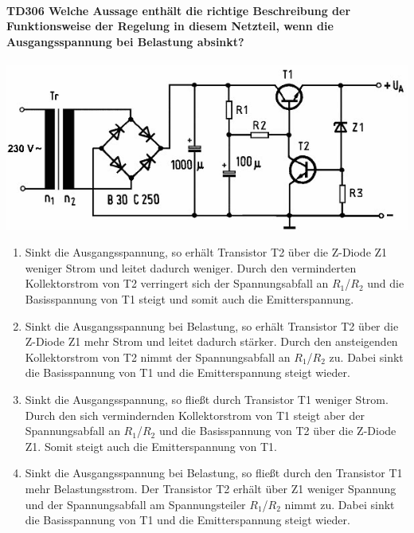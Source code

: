 \documentclass[8pt]{article}
\begin{document}
\begin{enumerate}
\begin{enumerate}[nolistsep,label=\Alph*]
{\paragraph*{TD306 Welche Aussage enthält die richtige Beschreibung der Funktionsweise der Regelung in diesem Netzteil, wenn die Ausgangsspannung bei Belastung absinkt?}
\begin{center}
	\begin{minipage}{\linewidth}
		\centering
		\includegraphics[scale=1.0]{pics/td306_a.jpg}
	\end{minipage}
\end{center}
\begin{enumerate}[nolistsep,label=\Alph*]
\item Sinkt die Ausgangsspannung, so erhält Transistor T2 über die Z-Diode Z1 weniger Strom und leitet dadurch weniger. Durch den verminderten Kollektorstrom von T2 verringert sich der Spannungsabfall an $R_{1}$/$R_{2}$ und die Basisspannung von T1 steigt und somit auch die Emitterspannung. 
\item Sinkt die Ausgangsspannung bei Belastung, so erhält Transistor T2 über die Z-Diode Z1 mehr Strom und leitet dadurch stärker. Durch den ansteigenden Kollektorstrom von T2 nimmt der Spannungsabfall an $R_{1}$/$R_{2}$ zu. Dabei sinkt die Basisspannung von T1 und die Emitterspannung steigt wieder.
\item Sinkt die Ausgangsspannung, so fließt durch Transistor T1 weniger Strom. Durch den sich vermindernden Kollektorstrom von T1 steigt aber der Spannungsabfall an $R_{1}$/$R_{2}$ und die Basisspannung von T2 über die Z-Diode Z1. Somit steigt auch die Emitterspannung von T1.
\item Sinkt die Ausgangsspannung bei Belastung, so fließt durch den Transistor T1 mehr Belastungsstrom. Der Transistor T2 erhält über Z1 weniger Spannung und der Spannungsabfall am Spannungsteiler $R_{1}$/$R_{2}$ nimmt zu. Dabei sinkt die Basisspannung von T1 und die Emitterspannung steigt wieder.
\end{enumerate}

}
\end{enumerate}
\end{enumerate}
\end{document}
